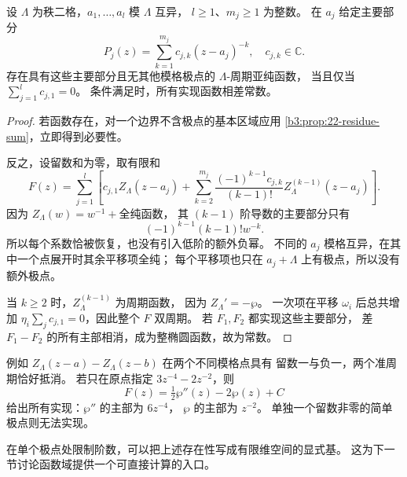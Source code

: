 \begin{proposition}[椭圆主要部分的实现]\label{b3:prop:22-principal-parts}
设 \(\Lambda\) 为秩二格，\(a_1,\ldots,a_l\) 模 \(\Lambda\) 互异，
\(l\ge1\)、\(m_j\ge1\) 为整数。
在 \(a_j\) 给定主要部分
\[
 P_j(z)=\sum_{k=1}^{m_j}c_{j,k}(z-a_j)^{-k},\quad c_{j,k}\in\mathbb C.
\]
存在具有这些主要部分且无其他模格极点的 \(\Lambda\)-周期亚纯函数，
当且仅当 \(\sum_{j=1}^l c_{j,1}=0\)。
条件满足时，所有实现函数相差常数。
\end{proposition}
\begin{proof}
若函数存在，对一个边界不含极点的基本区域应用
\cref{b3:prop:22-residue-sum}，立即得到必要性。

反之，设留数和为零，取有限和
\[
 F(z)=\sum_{j=1}^l\left[
 c_{j,1}Z_\Lambda(z-a_j)
 +\sum_{k=2}^{m_j}
    \frac{(-1)^{k-1}c_{j,k}}{(k-1)!}
    Z_\Lambda^{(k-1)}(z-a_j)\right].
\]
因为 \(Z_\Lambda(w)=w^{-1}+\)全纯函数，
其 \((k-1)\) 阶导数的主要部分只有
\[
 (-1)^{k-1}(k-1)!w^{-k}.
\]
所以每个系数恰被恢复，也没有引入低阶的额外负幂。
不同的 \(a_j\) 模格互异，在其中一个点展开时其余平移项全纯；
每个平移项也只在 \(a_j+\Lambda\) 上有极点，所以没有额外极点。

当 \(k\ge2\) 时，\(Z_\Lambda^{(k-1)}\) 为周期函数，
因为 \(Z_\Lambda'=-\wp\)。
一次项在平移 \(\omega_i\) 后总共增加
\(\eta_i\sum_jc_{j,1}=0\)，因此整个 \(F\) 双周期。
若 \(F_1,F_2\) 都实现这些主要部分，
差 \(F_1-F_2\) 的所有主部相消，成为整椭圆函数，故为常数。
\end{proof}

例如 \(Z_\Lambda(z-a)-Z_\Lambda(z-b)\) 在两个不同模格点具有
留数一与负一，两个准周期恰好抵消。
若只在原点指定 \(3z^{-4}-2z^{-2}\)，则
\[
 F(z)=\tfrac12\wp''(z)-2\wp(z)+C
\]
给出所有实现：\(\wp''\) 的主部为 \(6z^{-4}\)，
\(\wp\) 的主部为 \(z^{-2}\)。
单独一个留数非零的简单极点则无法实现。

\ProseParagraphBreak
在单个极点处限制阶数，可以把上述存在性写成有限维空间的显式基。
这为下一节讨论函数域提供一个可直接计算的入口。


